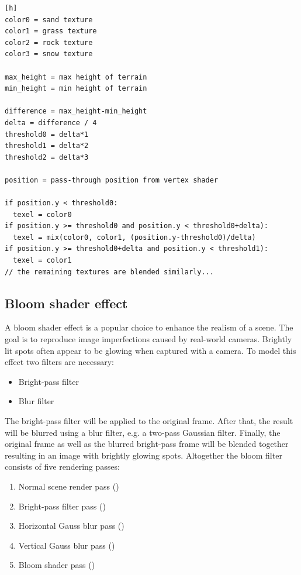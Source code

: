 \documentclass[11pt,a4paper,twoside,openright]{report}
\begin{document}
\begin{lstlisting}[caption=Fragment shader texture chooser pseudocode][h]
color0 = sand texture
color1 = grass texture
color2 = rock texture
color3 = snow texture

max_height = max height of terrain
min_height = min height of terrain

difference = max_height-min_height
delta = difference / 4
threshold0 = delta*1
threshold1 = delta*2
threshold2 = delta*3

position = pass-through position from vertex shader

if position.y < threshold0:
  texel = color0
if position.y >= threshold0 and position.y < threshold0+delta):
  texel = mix(color0, color1, (position.y-threshold0)/delta)
if position.y >= threshold0+delta and position.y < threshold1):
  texel = color1
// the remaining textures are blended similarly...
\end{lstlisting}

\subsection{Bloom shader effect}
A bloom shader effect is a popular choice to enhance the realism of a scene. The goal is to reproduce image imperfections caused by real-world cameras. Brightly lit spots often appear to be glowing when captured with a camera. To model this effect two filters are necessary:
\begin{itemize}
\item Bright-pass filter
\item Blur filter
\end{itemize}
The bright-pass filter will be applied to the original frame. After that, the result will be blurred using a blur filter, e.g. a two-pass Gaussian filter. Finally, the original frame as well as the blurred bright-pass frame will be blended together resulting in an image with brightly glowing spots. Altogether the bloom filter consists of five rendering passes:
\begin{enumerate}
  \item Normal scene render pass ()
  \item Bright-pass filter pass ()
  \item Horizontal Gauss blur pass ()
  \item Vertical Gauss blur pass ()
  \item Bloom shader pass ()
\end{enumerate}
\end{document}
